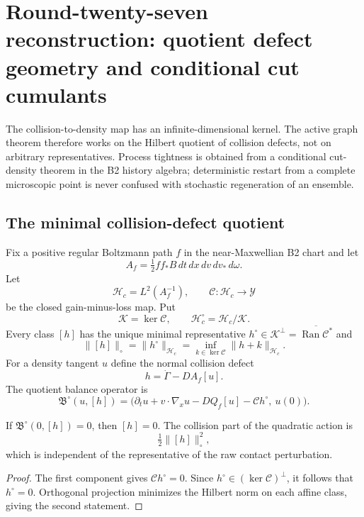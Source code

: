 
\section{Round-twenty-seven reconstruction: quotient defect geometry and conditional cut cumulants}
\label{sec:r27-b3}

The collision-to-density map has an infinite-dimensional kernel.  The active
graph theorem therefore works on the Hilbert quotient of collision defects,
not on arbitrary representatives.  Process tightness is obtained from a
conditional cut-density theorem in the B2 history algebra; deterministic
restart from a complete microscopic point is never confused with stochastic
regeneration of an ensemble.

\subsection{The minimal collision-defect quotient}

Fix a positive regular Boltzmann path $f$ in the near-Maxwellian B2 chart and
let
\[
 A_f=\tfrac12ff_*B\,dt\,dx\,dv\,dv_*\,d\omega.
\]
Let
\[
 \mathcal H_c=L^2(A_f^{-1}),\qquad
 \mathcal C:\mathcal H_c\longrightarrow\mathcal Y
\]
be the closed gain-minus-loss map.  Put
\[
 \mathcal K=\ker\mathcal C,\qquad
 \mathcal H_c^\circ=\mathcal H_c/\mathcal K.
\]
Every class $[h]$ has the unique minimal representative
$h^\circ\in\mathcal K^\perp=\overline{\operatorname{Ran}\mathcal C^*}$ and
\[
 \|[h]\|_\circ=\|h^\circ\|_{\mathcal H_c}
 =\inf_{k\in\ker\mathcal C}\|h+k\|_{\mathcal H_c}.         \tag{B3.1}
\]
For a density tangent $u$ define the normal collision defect
\[
 h=\dot\Gamma-D A_f[u].
\]
The quotient balance operator is
\[
 \mathfrak B^\circ(u,[h])
 =\bigl(\partial_tu+v\cdot\nabla_xu-DQ_f[u]-\mathcal Ch^\circ,\ u(0)\bigr).
                                                                    \tag{B3.2}
\]

\begin{lemma}
\label{lem:r27-b3-quotient}
If $\mathfrak B^\circ(0,[h])=0$, then $[h]=0$.  The collision part of the
quadratic action is
\[
 \tfrac12\|[h]\|_\circ^2,
\]
which is independent of the representative of the raw contact perturbation.
\end{lemma}

\begin{proof}
The first component gives $\mathcal Ch^\circ=0$.  Since
$h^\circ\in(\ker\mathcal C)^\perp$, it follows that $h^\circ=0$.
Orthogonal projection minimizes the Hilbert norm on each affine class, giving
the second statement.
\end{proof}

